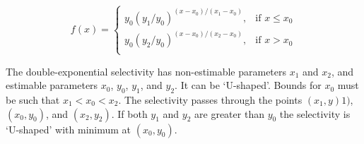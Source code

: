 \begin{equation} 
f(x)=\begin{cases}
	  y_0(y_1 / y_0)^{(x-x_0)/(x_1-x_0)}, & \text{if $x \le x_0$} \\
	  y_0(y_2 / y_0)^{(x-x_0)/(x_2-x_0)}, & \text{if $x > x_0$} \\
  \end{cases}
\end{equation}

The double-exponential selectivity has non-estimable parameters $x_1$ and $x_2$, and estimable parameters $x_0$, $y_0$, $y_1$, and $y_2$. It can be `U-shaped'. Bounds for $x_0$ must be such that $x_1 < x_0 < x_2$. The selectivity passes through the points $(x_1, y)1)$, $(x_0, y_0)$, and $(x_2, y_2)$. If both $y_1$ and $y_2$ are greater than $y_0$ the selectivity is `U-shaped' with minimum at $(x_0, y_0)$.


